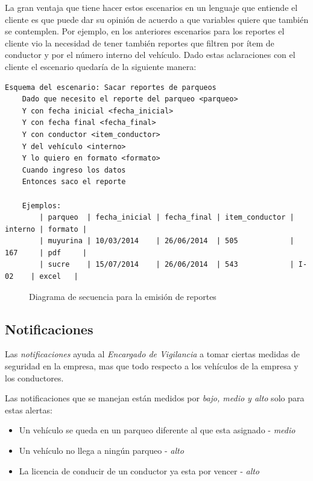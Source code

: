 La gran ventaja que tiene hacer estos escenarios en un lenguaje que entiende el
cliente es que puede dar su opinión de acuerdo a que variables quiere que también
se contemplen. Por ejemplo, en los anteriores escenarios para los reportes el
cliente vio la necesidad de tener también reportes que filtren por ítem de conductor
y por el número interno del vehículo. Dado estas aclaraciones con el cliente
el escenario quedaría de la siguiente manera:

{\scriptsize
\begin{verbatim}
Esquema del escenario: Sacar reportes de parqueos
    Dado que necesito el reporte del parqueo <parqueo>
    Y con fecha inicial <fecha_inicial>
    Y con fecha final <fecha_final>
    Y con conductor <item_conductor>
    Y del vehículo <interno>
    Y lo quiero en formato <formato>
    Cuando ingreso los datos
    Entonces saco el reporte

    Ejemplos:
        | parqueo  | fecha_inicial | fecha_final | item_conductor | interno | formato |
        | muyurina | 10/03/2014    | 26/06/2014  | 505            | 167     | pdf     |
        | sucre    | 15/07/2014    | 26/06/2014  | 543            | I-02    | excel   |
\end{verbatim}
}

\begin{figure}[h]
  \begin{center}
    \def\svgwidth{\columnwidth}
    
    \caption[Diagrama de secuencia - Solicitud de reportes]{
    Diagrama de secuencia para la emisión de reportes}
  \end{center}
\end{figure}

\subsection{Notificaciones}
Las {\it notificaciones} ayuda al {\it Encargado de Vigilancia} a tomar ciertas medidas
de seguridad en la empresa, mas que todo respecto a los vehículos de la empresa y
los conductores.

Las notificaciones que se manejan están medidos por {\it bajo, medio y alto} solo
para estas alertas:

\begin{itemize}
  \item Un vehículo se queda en un parqueo diferente al que esta asignado - {\it medio}
  \item Un vehículo no llega a ningún parqueo - {\it alto}
  \item La licencia de conducir de un conductor ya esta por vencer - {\it alto}
\end{itemize}

